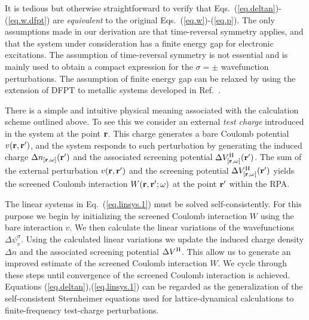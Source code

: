 \documentclass[twocolumn,prb,showpacs,superscriptaddress]{revtex4}
\def\s1{\hspace{0.5cm}}
\def\s2{\hspace{1cm}}
\def\w{\omega}
\def\s{\sigma}
\def\r{{\bf r}}
\def\rp{{\bf r^\prime}}
\begin{document}
It is tedious but otherwise straightforward to verify that 
Eqs.\ (\ref{eq.deltan})-(\ref{eq.w.dfpt}) are {\it equivalent} to the 
original Eqs.\ (\ref{eq.w})-(\ref{eq.p}).
The only assumptions made in our derivation are that 
time-reversal symmetry applies,
and that the system under consideration has a finite 
energy gap for electronic excitations. 
The assumption of time-reversal symmetry is not essential and is mainly used to
obtain a compact expression for the $\sigma=\pm$ wavefunction perturbations.
The assumption of finite energy gap can be relaxed by using the extension
of DFPT to metallic systems developed in Ref.\ . 


There is a simple and intuitive physical meaning associated with 
the calculation scheme outlined above. To see this
we consider an external {\it test charge} introduced in the system
at the point $\r$. This charge generates a bare Coulomb potential $v(\r,\rp)$,
and the system responds to such perturbation by generating the induced charge
$\Delta n_{[\r,\w]}(\rp)$ and the associated 
screening potential $\Delta V^{\rm H}_{[\r,\w]}(\rp)$.
The sum of the external perturbation $v(\r,\rp)$ and the screening
potential $\Delta V^{\rm H}_{[\r,\w]}(\rp)$ yields the screened Coulomb
interaction $W(\r,\rp;\w)$ at the point $\rp$ within the RPA.

The linear systems in Eq.\ (\ref{eq.linsys.1}) must be solved self-consistently.
For this purpose we begin by initializing the screened Coulomb
interaction $W$ using the bare interaction $v$. 
We then calculate the linear variations of the wavefunctions $\Delta \psi_v^\sigma$.
Using the calculated linear variations we update the induced charge density $\Delta n$
and the associated screening potential $\Delta V^{\rm H}$. This allow us to
generate an improved estimate of the screened Coulomb interaction $W$.
We cycle through these steps until convergence of the screened Coulomb
interaction is achieved.
Equations (\ref{eq.deltan}),(\ref{eq.linsys.1}) can be regarded as
the generalization of the self-consistent Sternheimer equations used for lattice-dynamical 
calculations\cite{baroni.rmp} to finite-frequency test-charge perturbations.
\end{document}
